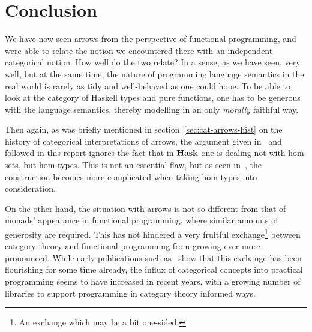 \chapter{Conclusion}

We have now seen arrows from the perspective of functional programming, and
were able to relate the notion we encountered there with an independent
categorical notion. How well do the two relate? In a sense, as we have seen,
very well, but at the same time, the nature of programming language
semantics in the real world is rarely as tidy and well-behaved as one could
hope. To be able to look at the category of Haskell types and pure
functions, one has to be generous with the language semantics, thereby
modelling in an only \emph{morally} faithful way.

Then again, as was briefly mentioned in section~\ref{sec:cat-arrows-hist} on
the history of categorical interpretations of arrows, the argument given
in~\cite{cat-semantics-arr} and followed in this report ignores the fact that
in $\mathbf{Hask}$ one is dealing not with hom-sets, but hom-types. This is not an
essential flaw, but as seen in~\cite{atkey-fix}, the construction becomes more
complicated when taking hom-types into consideration.

On the other hand, the situation with arrows is not so different from that
of monads' appearance in functional programming, where similar amounts of
generosity are required. This has not hindered a very fruitful
exchange\footnote{An exchange which may be a bit one-sided.} between
category theory and functional programming from growing ever more
pronounced. While early publications such as~\cite{cats-and-cp} show that
this exchange has been flourishing for some time already, the influx of
categorical concepts into practical programming seems to have increased in
recent years, with a growing number of libraries to support programming in
category theory informed ways.
